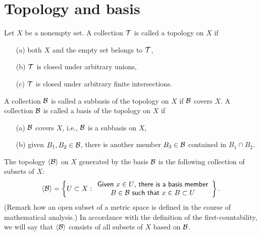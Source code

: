 \section{Topology and basis}

\begin{defi}
    Let $X$ be a nonempty set.
    A collection ${\mathcal{T}}$ is called a topology on $X$ if
    \begin{enumerate}
        \item[(a)]
        {
            both $X$ and the empty set belongs to ${\mathcal{T}}$,
        }
        \item[(b)]
        {
            ${\mathcal{T}}$ is closed under arbitrary unions,
        }
        \item[(c)]
        {
            ${\mathcal{T}}$ is closed under arbitrary finite intersections.
        }
    \end{enumerate}
\end{defi}

\begin{defi}
    A collection ${\mathcal{B}}$ is called a subbasis of the topology on $X$ if ${\mathcal{B}}$ covers $X$.
    A collection ${\mathcal{B}}$ is called a basis of the topology on $X$ if
    \begin{enumerate}
        \item[(a)]
        {
            ${\mathcal{B}}$ covers $X$, i.e., ${\mathcal{B}}$ is a subbasis on $X$,
        }
        \item[(b)]
        {
            given $B_1, B_2\in{\mathcal{B}}$, there is another member $B_3\in{\mathcal{B}}$ contained in $B_1\cap B_2$.
        }
    \end{enumerate}
    The topology $\langle{\mathcal{B}}\rangle$ on $X$ generated by the basis ${\mathcal{B}}$ is the following collection of subsets of $X$:
    \begin{align*}
        {\left\langle{{\mathcal{B}}}\right\rangle}=\left\{
            U\subset X:
                \begin{array}{c}
                    \textsf{Given $x\in U$, there is a basis member}\\
                    \textsf{$B\in{\mathcal{B}}$ such that $x\in B\subset U$}
                \end{array}\right\}.
    \end{align*}
    (Remark how an open subset of a metric space is defined in the course of mathematical analysis.)
    In accordance with the definition of the first-countability, we will say that ${\left\langle{{\mathcal{B}}}\right\rangle}$ consists of all subsets of $X$ based on ${\mathcal{B}}$.
\end{defi}


